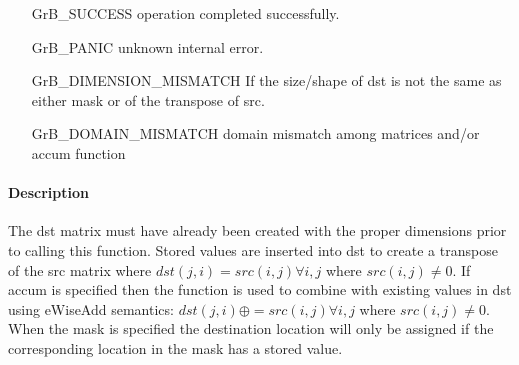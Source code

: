 
\begin{itemize}[leftmargin=2.1in]
\item[{\sf GrB\_SUCCESS}]     operation completed successfully.
\item[{\sf GrB\_PANIC}]        unknown internal error.
\item[{\sf GrB\_DIMENSION\_MISMATCH}]      
        If the size/shape of dst is not the same as either mask or
        of the transpose of src.
\item[{\sf GrB\_DOMAIN\_MISMATCH}]  
        domain mismatch among matrices and/or
        accum function 
\end{itemize}

\paragraph{Description}

The dst matrix must have already been created with the proper dimensions
prior to calling this function.  Stored values are inserted into dst to
create a transpose of the src matrix where 
$dst(j,i) = src(i,j) \forall i,j$ where $src(i,j) \neq 0$.
If accum is specified then the function is used to combine with existing values in dst using {\sf eWiseAdd} semantics:
$dst(j,i) \oplus = src(i,j) \forall i,j$ where $src(i,j) \neq 0$.
When the mask is specified the destination location will only be assigned if the corresponding location in the mask has a stored value.
